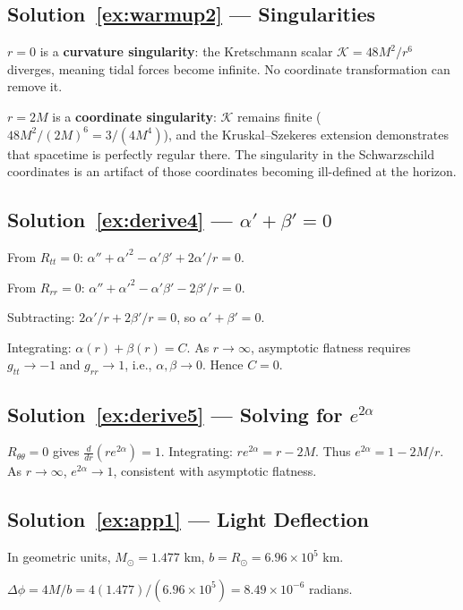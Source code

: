 \documentclass[12pt]{article}
\theoremstyle{definition}
\theoremstyle{remark}
\begin{document}
\subsection*{Solution~\ref{ex:warmup2} --- Singularities}

$r = 0$ is a \textbf{curvature singularity}: the Kretschmann scalar
$\mathcal{K} = 48M^{2}/r^{6}$ diverges, meaning tidal forces become infinite.
No coordinate transformation can remove it.

$r = 2M$ is a \textbf{coordinate singularity}: $\mathcal{K}$ remains finite
($48M^{2}/(2M)^{6} = 3/(4M^{4})$), and the Kruskal--Szekeres extension demonstrates
that spacetime is perfectly regular there. The singularity in the Schwarzschild
coordinates is an artifact of those coordinates becoming ill-defined at the horizon.

\subsection*{Solution~\ref{ex:derive4} --- $\alpha' + \beta' = 0$}

From $R_{tt}=0$: $\alpha'' + \alpha'^{2} - \alpha'\beta' + 2\alpha'/r = 0$.

From $R_{rr}=0$: $\alpha'' + \alpha'^{2} - \alpha'\beta' - 2\beta'/r = 0$.

Subtracting: $2\alpha'/r + 2\beta'/r = 0$, so $\alpha' + \beta' = 0$.

Integrating: $\alpha(r) + \beta(r) = C$. As $r \to \infty$, asymptotic flatness
requires $g_{tt} \to -1$ and $g_{rr} \to 1$, i.e., $\alpha,\beta \to 0$. Hence $C = 0$.

\subsection*{Solution~\ref{ex:derive5} --- Solving for $e^{2\alpha}$}

$R_{\theta\theta}=0$ gives $\frac{d}{dr}(re^{2\alpha}) = 1$.
Integrating: $re^{2\alpha} = r - 2M$.
Thus $e^{2\alpha} = 1 - 2M/r$.
As $r \to \infty$, $e^{2\alpha} \to 1$, consistent with asymptotic flatness.

\subsection*{Solution~\ref{ex:app1} --- Light Deflection}

In geometric units, $M_{\odot} = 1.477$ km, $b = R_{\odot} = 6.96 \times 10^{5}$ km.

$\Delta\phi = 4M/b = 4(1.477)/(6.96 \times 10^{5}) = 8.49 \times 10^{-6}$ radians.
\end{document}
